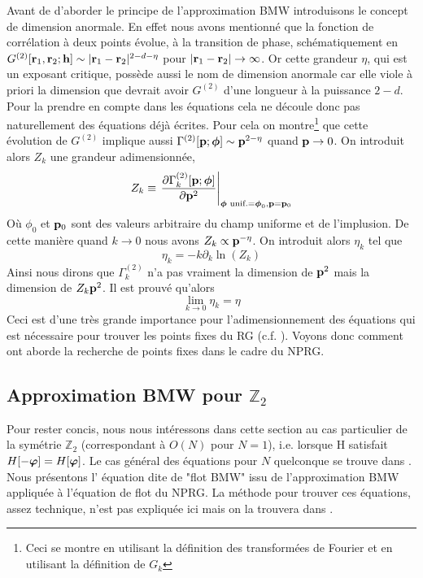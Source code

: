 \documentclass[10.5pt]{article}
\begin{document}
\begin{multicols*}{2}
{Avant de d'aborder le principe de l'approximation BMW introduisons le concept de dimension anormale. En effet nous avons mentionné que la fonction de corrélation à deux points évolue, à la transition de phase, schématiquement en $G^{(2)}[{\bf r}_1, {\bf r}_2; {\bf h}] \sim |{\bf r}_1 - {\bf r}_2|^{2-d-\eta}$ pour $|{\bf r}_1 - {\bf r}_2| \to \infty$. Or cette grandeur $\eta$, qui est un exposant critique, possède aussi le nom de dimension anormale car elle viole à priori la dimension que devrait avoir $G^{(2)}$ d'une longueur à la puissance $2-d$. Pour la prendre en compte dans les équations cela ne découle donc pas naturellement des équations déjà écrites. Pour cela on montre\footnote{Ceci se montre en utilisant la définition des transformées de Fourier et en utilisant la définition de $G_k$} que cette évolution de $G^{(2)}$ implique aussi $\Gamma^{(2)}[{\bf p}; \boldsymbol{ \phi}] \sim {\bf p}^{2-\eta}$ quand ${\bf p} \to 0$. On introduit alors $Z_k$ une grandeur adimensionnée,
\begin{equation}
	Z_k \equiv {\left. \frac{\partial \Gamma_k^{(2)}[{\bf p};\boldsymbol{ \phi}]}{\partial {\bf p}^2} \right|}_{\boldsymbol{ \phi} \text{ unif.} = \boldsymbol{ \phi}_0, {\bf p} = {\bf p}_0 }
	\label{eq:defZk}
\end{equation}
Où $\phi_0$ et ${\bf p}_0$ sont des valeurs arbitraire du champ uniforme et de l'implusion. De cette manière  quand $k \to 0$ nous avons $Z_k \propto {\bf p}^{-\eta}$.
On introduit alors $\eta_k$ tel que
\begin{equation}
	\eta_k = -k \partial_k \ln(Z_k)
\end{equation}
Ainsi nous dirons que $\Gamma^{(2)}_k$ n'a pas vraiment la dimension de ${\bf p}^2$ mais la dimension de $Z_k{\bf p}^2$. Il est prouvé qu'alors
\begin{equation}
 	\lim\limits_{k \to 0} \eta_k  = \eta
 \end{equation}
Ceci est d'une très grande importance pour l'adimensionnement des équations qui est nécessaire pour trouver les points fixes du RG (c.f. ). Voyons donc comment ont aborde la recherche de points fixes dans le cadre du NPRG. 

}





\subsection{Approximation BMW pour $\mathbb{Z}_2$} 
 
Pour rester concis, nous nous intéressons dans cette section au cas particulier de la symétrie $\mathbb{Z}_2$ (correspondant à $O(N)$ pour $N=1$), i.e. lorsque H satisfait $H[-\boldsymbol{ \varphi}] = H[\boldsymbol{ \varphi}]$. Le cas général des équations pour $N$ quelconque se trouve dans \cite{benitez2012nonperturbative}. Nous présentons l' équation dite de "flot BMW" issu de l'approximation BMW appliquée à l'équation de flot du NPRG. La méthode pour trouver ces équations, assez technique, n'est pas expliquée ici mais on la trouvera dans \cite{Blaizot}. \\ 


\end{multicols*}
\end{document}
